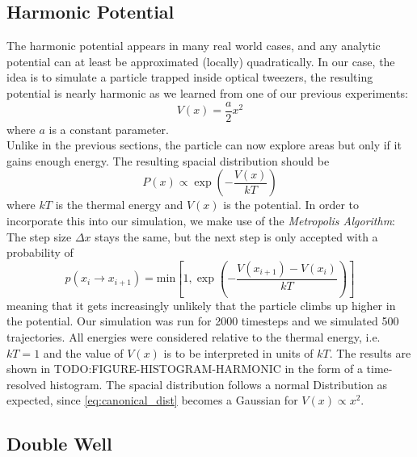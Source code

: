 \documentclass[
    parskip=half, 
    twoside=false,
    twocolumn=true,
    fontsize=11pt,
]{scrarticle}
\begin{document}
\subsection{Harmonic Potential}

The harmonic potential appears in many real world cases, and any analytic potential can at least be approximated (locally) quadratically. In our case, the idea is to simulate a particle trapped inside optical tweezers, the resulting potential is nearly harmonic as we learned from one of our previous experiments:
\begin{equation}
 V(x) = \frac{a}{2} x^2
\end{equation}
where $a$ is a constant parameter.\\
Unlike in the previous sections, the particle can now explore areas but only if it gains enough energy. The resulting spacial distribution should be
\begin{equation}
\label{eq:canonical_dist}
 P(x) \propto \exp\left(-\frac{V(x)}{k T}\right)
\end{equation}
where $k T$ is the thermal energy and $V(x)$ is the potential. In order to incorporate this into our simulation, we make use of the \textit{Metropolis Algorithm}: The step size $\Delta x$ stays the same, but the next step is only accepted with a probability of
\begin{equation}
 p(x_i \rightarrow x_{i+1}) = \text{min}\left[1,\exp\left(-\frac{V(x_{i+1})-V(x_i)}{k T}\right)\right]
\end{equation}
meaning that it gets increasingly unlikely that the particle climbs up higher in the potential. Our simulation was run for \SI{2000}{} timesteps and we simulated \SI{500}{} trajectories. All energies were considered relative to the thermal energy, i.e. $kT=1$ and the value of $V(x)$ is to be interpreted in units of $kT$. The results are shown in TODO:FIGURE-HISTOGRAM-HARMONIC in the form of a time-resolved histogram. The spacial distribution follows a normal Distribution as expected, since \autoref{eq:canonical_dist} becomes a Gaussian for $V(x)\propto x^2$.


\subsection{Double Well}
\end{document}
